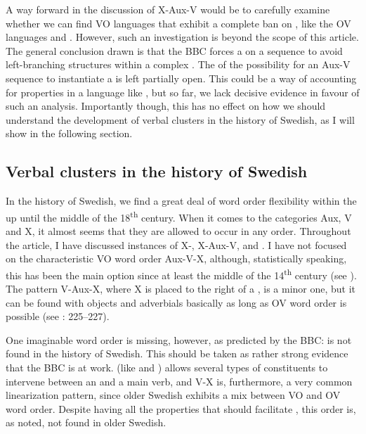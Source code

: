 \documentclass[output=paper, colorlinks, citecolor=brown]{langscibook}
\begin{document}
A way forward in the discussion of X-Aux-V would be to carefully examine whether we can find VO languages that exhibit a complete ban on , like the OV languages  and . However, such an investigation is beyond the scope of this article. The general conclusion drawn is that the BBC forces a  on a  sequence to avoid left-branching structures within a complex . The  of the possibility for an Aux-V sequence to instantiate a  is left partially open. This could be a way of accounting for  properties in a language like , but so far, we lack decisive evidence in favour of such an analysis. Importantly though, this  has no effect on how we should understand the development of verbal clusters in the history of Swedish, as I will show in the following section.


\subsection{Verbal clusters in the history of Swedish}\label{sec:sangfelt:5.3}

In the history of Swedish, we find a great deal of word order flexibility within the  up until the middle of the 18\textsuperscript{th} century. When it comes to the categories Aux, V and X, it almost seems that they are allowed to occur in any order. Throughout the article, I have discussed instances of X-, X-Aux-V, and . I have not focused on the characteristic VO word order Aux-V-X, although, statistically speaking, this has been the main option since at least the middle of the 14\textsuperscript{th} century (see \citealt{Delsing1999,Petzell2011,Sangfelt2019}). The pattern V-Aux-X, where X is placed to the right of a , is a minor one, but it can be found with objects and adverbials basically as long as OV word order is possible (see \citealt{Sangfelt2019}: 225–227).


One imaginable word order is missing, however, as predicted by the BBC:  is not found in the history of Swedish. This should be taken as rather strong evidence that the BBC is at work.  (like  and ) allows several types of constituents to intervene between an  and a main verb, and V-X is, furthermore, a very common linearization pattern, since older Swedish exhibits a mix between VO and OV word order. Despite having all the properties that should facilitate , this order is, as noted, not found in older Swedish.
\end{document}
